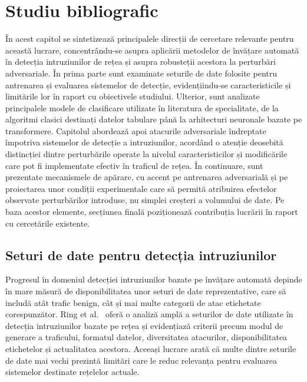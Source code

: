 \chapter{Studiu bibliografic}\label{ch:studiubib}

\pagestyle{fancy}

În acest capitol se sintetizează principalele direcții de cercetare relevante pentru această lucrare, concentrându-se asupra aplicării metodelor de învățare automată în detecția intruziunilor de rețea și asupra robusteții acestora la perturbări adversariale. În prima parte sunt examinate seturile de date folosite pentru antrenarea și evaluarea sistemelor de detecție, evidențiindu-se caracteristicile și limitările lor în raport cu obiectivele studiului. Ulterior, sunt analizate principalele modele de clasificare utilizate în literatura de specialitate, de la algoritmi clasici destinați datelor tabulare până la arhitecturi neuronale bazate pe transformere. Capitolul abordează apoi atacurile adversariale îndreptate împotriva sistemelor de detecție a intruziunilor, acordând o atenție deosebită distincției dintre perturbările operate la nivelul caracteristicilor și modificările care pot fi implementate efectiv în traficul de rețea. În continuare, sunt prezentate mecanismele de apărare, cu accent pe antrenarea adversarială și pe proiectarea unor condiții experimentale care să permită atribuirea efectelor observate perturbărilor introduse, nu simplei creșteri a volumului de date. Pe baza acestor elemente, secțiunea finală poziționează contribuția lucrării în raport cu cercetările existente.

\section{Seturi de date pentru detecția intruziunilor}\label{sec:seturi-date}

Progresul în domeniul detecției intruziunilor bazate pe învățare automată depinde în mare măsură de disponibilitatea unor seturi de date reprezentative, care să includă atât trafic benign, cât și mai multe categorii de atac etichetate corespunzător. Ring et al.~\cite{ring2019survey} oferă o analiză amplă a seturilor de date utilizate în detecția intruziunilor bazate pe rețea și evidențiază criterii precum modul de generare a traficului, formatul datelor, diversitatea atacurilor, disponibilitatea etichetelor și actualitatea acestora. Aceeași lucrare arată că multe dintre seturile de date mai vechi prezintă limitări care le reduc relevanța pentru evaluarea sistemelor destinate rețelelor actuale.

